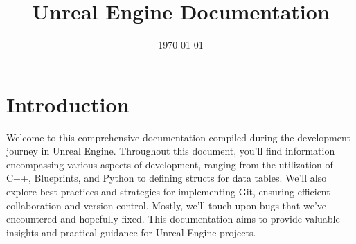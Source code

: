 \documentclass{uva-inf-article}
\title{Unreal Engine Documentation}
\date{\today}
\begin{document}
\maketitle


\tableofcontents
\newpage
\section{Introduction}
Welcome to this comprehensive documentation compiled during the development journey in Unreal Engine. Throughout this document, you'll find information encompassing various aspects of development, ranging from the utilization of C++, Blueprints, and Python to defining structs for data tables. We'll also explore best practices and strategies for implementing Git, ensuring efficient collaboration and version control. Mostly, we'll touch upon bugs that we've encountered and hopefully fixed. This documentation aims to provide valuable insights and practical guidance for Unreal Engine projects.

\end{document}
